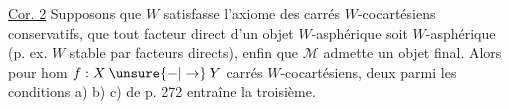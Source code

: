 
\uline{Cor. 2} Supposons que $W$ satisfasse l'axiome des carrés $W$-cocartésiens conservatifs, que tout facteur direct d'un objet $W$-asphérique soit $W$-asphérique (p. ex. $W$ stable par facteurs directs), enfin que $\mathcal M$ admette un objet final. Alors pour   hom $f:X\mathbin{\unsure{-|\to}}Y$  carrés $W$-cocartésiens,  deux parmi les conditions a) b) c) de p. 272 entraîne la troisième.
